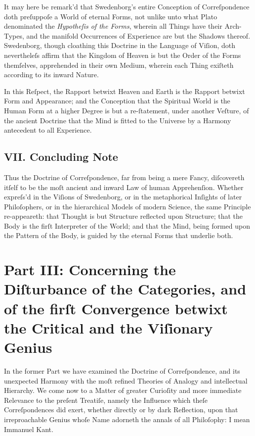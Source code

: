 \documentclass[12pt]{article}
\begin{document}
It may here be remark’d that Swedenborg’s entire Conception of 
Correſpondence doth preſuppoſe a World of eternal Forms, not unlike unto what 
Plato denominated the \textit{Hypotheſis of the Forms}, wherein all Things 
have their Arch-Types, and the manifold Occurrences of Experience are but 
the Shadows thereof. Swedenborg, though cloathing this Doctrine in the 
Language of Viſion, doth nevertheleſs affirm that the Kingdom of Heaven is 
but the Order of the Forms themſelves, apprehended in their own Medium, 
wherein each Thing exiſteth according to its inward Nature.

In this Reſpect, the Rapport betwixt Heaven and Earth is the Rapport betwixt 
Form and Appearance; and the Conception that the Spiritual World is the 
Human Form at a higher Degree is but a re-ſtatement, under another Veſture, 
of the ancient Doctrine that the Mind is fitted to the Universe by a Harmony 
antecedent to all Experience.

\subsection*{VII. Concluding Note}

Thus the Doctrine of Correſpondence, far from being a mere Fancy, 
diſcovereth itſelf to be the moſt ancient and inward Law of human 
Apprehenſion. Whether expreſs’d in the Viſions of Swedenborg, or in the 
metaphorical Inſights of later Philoſophers, or in the hierarchical Models 
of modern Science, the same Principle re-appeareth: that Thought is but 
Structure reflected upon Structure; that the Body is the firſt Interpreter of 
the World; and that the Mind, being formed upon the Pattern of the Body, is 
guided by the eternal Forms that underlie both.

\newpage

\section*{Part III: Concerning the Diſturbance of the Categories, and of the firſt Convergence betwixt the Critical and the Viſionary Genius}

In the former Part we have examined the Doctrine of Correſpondence, and its 
unexpected Harmony with the moſt refined Theories of Analogy and intellectual 
Hierarchy. We come now to a Matter of greater Curioſity and more immediate 
Relevance to the preſent Treatiſe, namely the Influence which theſe 
Correſpondences did exert, whether directly or by dark Reflection, upon that 
irreproachable Genius whoſe Name adorneth the annals of all Philoſophy: I mean 
Immanuel Kant.
\end{document}
